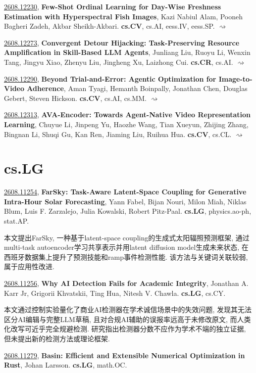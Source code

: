 \documentclass[9pt, a4paper]{article}
\theoremstyle{plain}
\theoremstyle{definition}
\theoremstyle{remark}
\newcommand{\arxivwithtarget}[3]{\hypertarget{#1}{}\href{https://arxiv.org/abs/#1}{#1}, \textbf{\textcolor{arxivblue}{#2}}, #3. }
\newcommand{\arxiv}[3]{\href{https://arxiv.org/abs/#1}{#1}, \textbf{\textcolor{arxivblue}{#2}}, #3. }
\begin{document}
\arxiv{2608.12230}{Few-Shot Ordinal Learning for Day-Wise Freshness Estimation with Hyperspectral Fish Images}{Kazi Nabiul Alam, Pooneh Bagheri Zadeh, Akbar Sheikh-Akbari}\textbf{cs.CV}, cs.AI, eess.IV, eess.SP. \hyperlink{2608.12230}{$\rightsquigarrow$}

\arxiv{2608.12273}{Convergent Detour Hijacking: Task-Preserving Resource Amplification in Skill-Based LLM Agents}{Junliang Liu, Ruoyu Li, Wenxin Tang, Jingyu Xiao, Zhenyu Liu, Jingheng Xu, Laizhong Cui}\textbf{cs.CR}, cs.AI. \hyperlink{2608.12273}{$\rightsquigarrow$}

\arxiv{2608.12290}{Beyond Trial-and-Error: Agentic Optimization for Image-to-Video Adherence}{Aman Tyagi, Hemanth Boinpally, Jonathan Chen, Douglas Gebert, Steven Hickson}\textbf{cs.CV}, cs.AI, cs.MM. \hyperlink{2608.12290}{$\rightsquigarrow$}

\arxiv{2608.12313}{AVA-Encoder: Towards Agent-Native Video Representation Learning}{Chuyue Li, Jinpeng Yu, Haozhe Wang, Tian Xueyun, Zhijing Zhang, Bingnan Li, Shuqi Gu, Kan Ren, Jiaming Liu, Ruihua Hua}\textbf{cs.CV}, cs.CL. \hyperlink{2608.12313}{$\rightsquigarrow$}


\section{cs.LG}
\arxivwithtarget{2608.11254}{FarSky: Task-Aware Latent-Space Coupling for Generative Intra-Hour Solar Forecasting}{Yann Fabel, Bijan Nouri, Milon Miah, Niklas Blum, Luis F. Zarzalejo, Julia Kowalski, Robert Pitz-Paal}\textbf{cs.LG}, physics.ao-ph, stat.AP.

本文提出FarSky, 一种基于latent-space coupling的生成式太阳辐照预测框架, 通过multi-task autoencoder学习共享表示并用latent diffusion model生成未来状态, 在西班牙数据集上提升了预测技能和ramp事件检测性能. 该方法与关键词关联较弱, 属于应用性改进.


\arxivwithtarget{2608.11256}{Why AI Detection Fails for Academic Integrity}{Jonathan A. Karr Jr, Grigorii Khvatskii, Ting Hua, Nitesh V. Chawla}\textbf{cs.LG}, cs.CY.

本文通过控制实验量化了商业AI检测器在学术诚信场景中的失效问题, 发现其无法区分AI编辑与完整LLM草稿, 且对合规AI辅助的误报率远高于未修改原文, 而人类化改写可近乎完全规避检测. 研究指出检测器分数不应作为学术不端的独立证据, 但未提出新的检测方法或理论框架.


\arxivwithtarget{2608.11279}{Basin: Efficient and Extensible Numerical Optimization in Rust}{Johan Larsson}\textbf{cs.LG}, math.OC.
\end{document}
